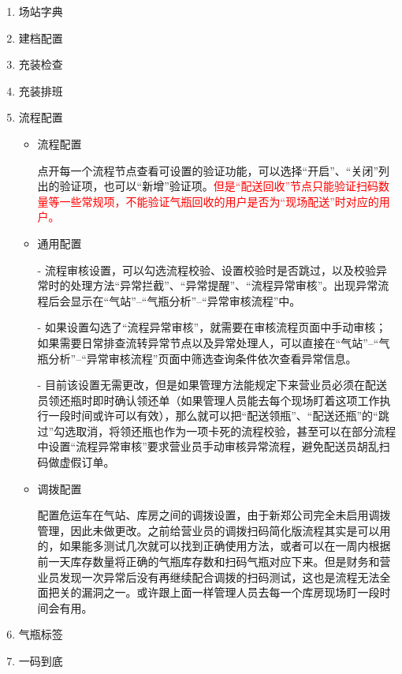 \documentclass[UTF8]{ctexart}
\begin{document}
\begin{enumerate}
	\item 场站字典
	
	\item 建档配置
	
	\item 充装检查
	
	\item 充装排班
	
	\item 流程配置
	
		\begin{itemize}
			
		\item 流程配置
		
		点开每一个流程节点查看可设置的验证功能，可以选择“开启”、“关闭”列出的验证项，也可以“新增”验证项。\textcolor{red}{但是“配送回收”节点只能验证扫码数量等一些常规项，不能验证气瓶回收的用户是否为“现场配送”时对应的用户。}
		
		\item 通用配置
		
		- 流程审核设置，可以勾选流程校验、设置校验时是否跳过，以及校验异常时的处理方法“异常拦截”、“异常提醒”、“流程异常审核”。出现异常流程后会显示在“气站”--“气瓶分析”--“异常审核流程”中。
		
		- 如果设置勾选了“流程异常审核”，就需要在审核流程页面中手动审核；如果需要日常排查流转异常节点以及异常处理人，可以直接在“气站”--“气瓶分析”--“异常审核流程”页面中筛选查询条件依次查看异常信息。
		
		- 目前该设置无需更改，但是如果管理方法能规定下来营业员必须在配送员领还瓶时即时确认领还单（如果管理人员能去每个现场盯着这项工作执行一段时间或许可以有效），那么就可以把“配送领瓶”、“配送还瓶”的“跳过”勾选取消，将领还瓶也作为一项卡死的流程校验，甚至可以在部分流程中设置“流程异常审核”要求营业员手动审核异常流程，避免配送员胡乱扫码做虚假订单。
		
		\item 调拨配置
		
		配置危运车在气站、库房之间的调拨设置，由于新郑公司完全未启用调拨管理，因此未做更改。之前给营业员的调拨扫码简化版流程其实是可以用的，如果能多测试几次就可以找到正确使用方法，或者可以在一周内根据前一天库存数量将正确的气瓶库存数和扫码气瓶对应下来。但是财务和营业员发现一次异常后没有再继续配合调拨的扫码测试，这也是流程无法全面把关的漏洞之一。或许跟上面一样管理人员去每一个库房现场盯一段时间会有用。
		

		\end{itemize}
	
	\item 气瓶标签
	
	\item 一码到底
	
	
	
\end{enumerate}
\end{document}
